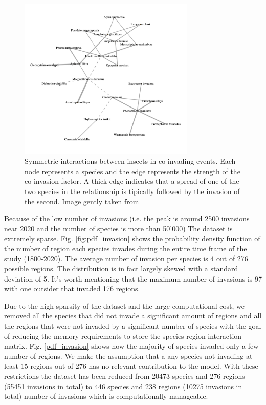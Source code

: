 \documentclass[mscthesis]{usiinfthesis}
\begin{document}
\begin{figure}[H]
    \centering
    \includegraphics[width=0.75\textwidth]{coinvasion.png}
    \caption{Symmetric interactions between insects in co-invading events. Each node represents a species and the edge represents the strength of the co-invasion factor. A thick edge indicates that a spread of one of the two species in the relationship is tipically followed by the invasion of the second. Image gently taken from \cite{intro:ecological}}
    \label{fig:hist_tax_fam}
\end{figure}

Because of the low number of invasions (i.e. the peak is around 2500 invasions near 2020 and the number of species is more than 50'000) The dataset is extremely sparse. Fig. \ref{fig:pdf_invasion} shows the probability density function of the number of region each species invades during the entire time frame of the study (1800-2020).  The average number of invasion per species is 4 out of 276 possible regions. The distribution is in fact largely skewed with a standard deviation of 5. It's worth mentioning that the maximum number of invasions is 97 with one outsider that invaded 176 regions.



Due to the high sparsity of the dataset and the large computational cost, we removed all the species that did not invade a significant amount of regions and all the regions that were not invaded by a significant number of species with the goal of reducing the memory requirements to store the species-region interaction matrix. Fig. \ref{pdf_invasion} shows how the majority of species invaded only a few number of regions. We make the assumption that a any species not invading at least 15 regions out of 276 has no relevant contribution to the model. With these restrictions the dataset has been reduced from 20473 species and 276 regions (55451 invasions in total) to 446 species and 238 regions (10275 invasions in total) number of invasions which is computationally manageable. 
\end{document}
